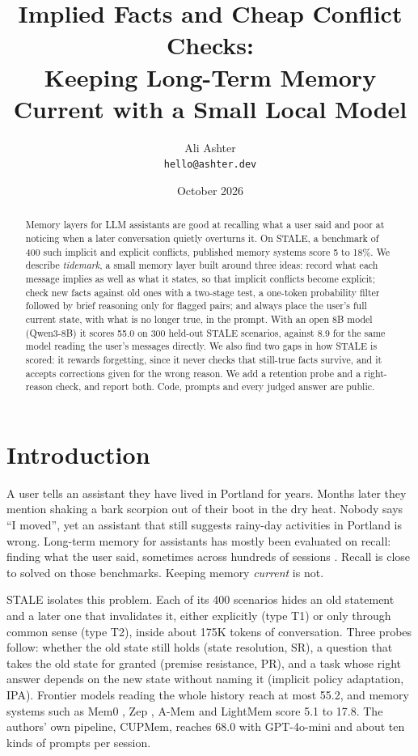 \documentclass[10pt,twocolumn]{article}
\title{Implied Facts and Cheap Conflict Checks:\\Keeping Long-Term Memory Current with a Small Local Model}
\author{Ali Ashter\\\texttt{hello@ashter.dev}}
\date{October 2026}
\begin{document}
\maketitle

\begin{abstract}
Memory layers for LLM assistants are good at recalling what a user said and poor at noticing when a later
conversation quietly overturns it. On STALE, a benchmark of 400 such implicit and explicit conflicts, published
memory systems score 5 to 18\%. We describe \emph{tidemark}, a small memory layer built around three ideas: record
what each message implies as well as what it states, so that implicit conflicts become explicit; check new facts
against old ones with a two-stage test, a one-token probability filter followed by brief reasoning only for flagged
pairs; and always place the user's full current state, with what is no longer true, in the prompt. With an open 8B
model (Qwen3-8B) it scores 55.0 on 300 held-out STALE scenarios, against 8.9 for the same model reading the user's
messages directly. We also find two gaps in how STALE is scored: it rewards forgetting, since it never checks that
still-true facts survive, and it accepts corrections given for the wrong reason. We add a retention probe and a
right-reason check, and report both. Code, prompts and every judged answer are public.
\end{abstract}

\section{Introduction}

A user tells an assistant they have lived in Portland for years. Months later they mention shaking a bark scorpion
out of their boot in the dry heat. Nobody says ``I moved'', yet an assistant that still suggests rainy-day
activities in Portland is wrong. Long-term memory for assistants has mostly been evaluated on recall: finding what the
user said, sometimes across hundreds of sessions \cite{locomo,longmemeval}. Recall is close to solved on those
benchmarks. Keeping memory \emph{current} is not.

STALE \cite{stale} isolates this problem. Each of its 400 scenarios hides an old statement and a later one that
invalidates it, either explicitly (type T1) or only through common sense (type T2), inside about 175K tokens of
conversation. Three probes follow: whether the old state still holds (state resolution, SR), a question that takes
the old state for granted (premise resistance, PR), and a task whose right answer depends on the new state without
naming it (implicit policy adaptation, IPA). Frontier models reading the whole history reach at most 55.2, and
memory systems such as Mem0 \cite{mem0}, Zep \cite{zep}, A-Mem \cite{amem} and LightMem score 5.1 to 17.8. The
authors' own pipeline, CUPMem, reaches 68.0 with GPT-4o-mini and about ten kinds of prompts per session.
\end{document}
